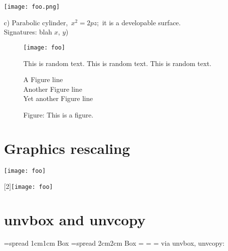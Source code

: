 \documentclass{article}
\begin{document}
\begin{center}
\texttt{[image: foo.png]}
\bigskip

c) Parabolic cylinder, \,$x^2 = 2pz$;\, it is a developable surface. \\
Signatures: blah $x$, $y$)
\end{center}

\begin{figure}
\begin{center}
\texttt{[image: foo]}
\caption{This is random text. This is random text. This is random text.}
\end{center}
\end{figure}

\begin{figure}
\begin{center}
A Figure line\\
Another Figure line\\
Yet another Figure line\\
\caption{Figure: This is a figure.} 
\end{center}
\end{figure}


\section{Graphics rescaling}
\texttt{[image: foo]}

\scalebox{3}[2]{\texttt{[image: foo]}}

\section{unvbox and unvcopy}
%
\newbox\boxA
\newbox\boxB
\newbox\boxC
\newbox\boxD
\newbox\boxE
\setbox\boxA=\vbox spread 1cm{1cm Box}
\setbox\boxB=\vbox spread 2cm{2cm Box}
\setbox\boxC=\vbox{\unvcopy\boxA\unvcopy\boxB}
\setbox\boxD=\vbox{\unvbox\boxA\unvbox\boxB}
\setbox\boxE=\vbox{\unvbox\boxC\unvbox\boxD}
%
via unvbox, unvcopy: \fbox{\box\boxE}
\end{document}
